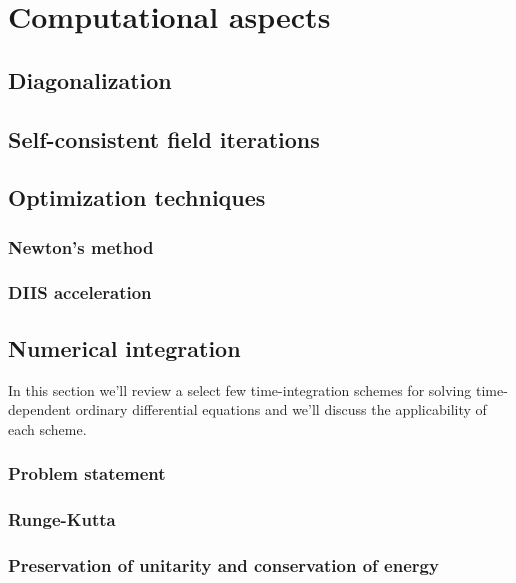 \chapter{Computational aspects}
    \section{Diagonalization}
    \section{Self-consistent field iterations}
    \section{Optimization techniques}
        \subsection{Newton's method}
        \subsection{DIIS acceleration}
    \section{Numerical integration}
        In this section we'll review a select few time-integration schemes for
        solving time-dependent ordinary differential equations and we'll discuss the
        applicability of each scheme.

        \subsection{Problem statement}
        \subsection{Runge-Kutta}
        \subsection{Preservation of unitarity and conservation of energy}
